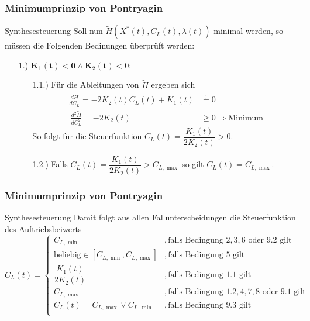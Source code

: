 \documentclass[aspectratio=169]{beamer}
\begin{document}
\begin{frame}
  \frametitle{Minimumprinzip von Pontryagin}
  \begin{block}{Synthesesteuerung}  
  \scriptsize
    Soll nun $\tilde{H}(X^{\ast}(t),C_L(t),\lambda(t))$ minimal werden, so müssen die Folgenden Bedinungen überprüft werden:
    \scriptsize
    \begin{enumerate}
        \item[1.)] $\mathbf{K_1(t) < 0 \wedge K_2(t)} < 0$:
          \scriptsize
        \begin{enumerate}
            \item[1.1.)] Für die Ableitungen von $\tilde{H}$ ergeben sich
            \[\begin{split}
            \frac{d \tilde{H}}{d C_L} = - 2 K_2(t) C_L(t) + K_1(t) &\stackrel{!}{=} 0 \\\
            \frac{d^2 \tilde{H}}{d C_L^2} = - 2 K_2(t) &\geq 0 \Rightarrow \text{Minimum}
            \end{split}\]
            So folgt für die Steuerfunktion $C_L(t) = \dfrac{K_1(t)}{2 K_2(t)} > 0$.
            \item[1.2.)] Falls $C_L(t) = \dfrac{K_1(t)}{2 K_2(t)} > C_{L, \max}$ so gilt  $C_L(t) = C_{L, \max}$.
        \end{enumerate}
        \end{enumerate}
      \end{block}
\end{frame}

\begin{frame}
  \frametitle{Minimumprinzip von Pontryagin}
  \begin{block}{Synthesesteuerung}  
  \scriptsize
  Damit folgt aus allen Fallunterscheidungen die Steuerfunktion des Auftriebsbeiwerts
\[C_L(t) = \left\lbrace 
\begin{array}{ll}
C_{L, \min} & ,\text{falls Bedingung } 2,3,6 \text{ oder } 9.2 \text{ gilt} \\ 
\text{beliebig} \in [C_{L, \min},C_{L, \max}] & ,\text{falls Bedingung } 5 \text{ gilt} \\ 
\dfrac{K_1(t)}{2 K_2(t)} & ,\text{falls Bedingung } 1.1 \text{ gilt} \\ 
C_{L, \max} & ,\text{falls Bedingung } 1.2,4,7,8 \text{ oder } 9.1 \text{ gilt} \\
C_L(t) = C_{L,\max} \vee C_{L,\min} & ,\text{falls Bedingung } 9.3 \text{ gilt} \\ 
\end{array} 
\right.\]
      \end{block}
\end{frame}
\end{document}
